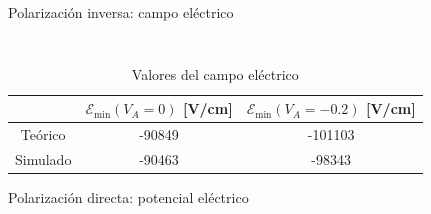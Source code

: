 \documentclass[aspectratio=169,xcolor=dvipsnames]{beamer}
\begin{document}
\begin{frame}{Polarización inversa: campo eléctrico}
\begin{columns}
\begin{column}{0.5\textwidth}
\begin{figure}
        \end{figure}
    \end{column}
    \end{columns}
    \begin{table}
        \caption{Valores del campo eléctrico}
        \begin{tabular}{c|cc}
            & $\mathcal{E}_{\min} (V_A=0)$ [V/cm] & $\mathcal{E}_{\min} (V_A=-0.2)$ [V/cm]  \\ \hline
            Teórico & -90849 & -101103 \\
            Simulado & -90463 & -98343 
        \end{tabular}
    \end{table}
\end{frame}

\begin{frame}{Polarización directa: potencial eléctrico}
    

\end{frame}
\end{document}
